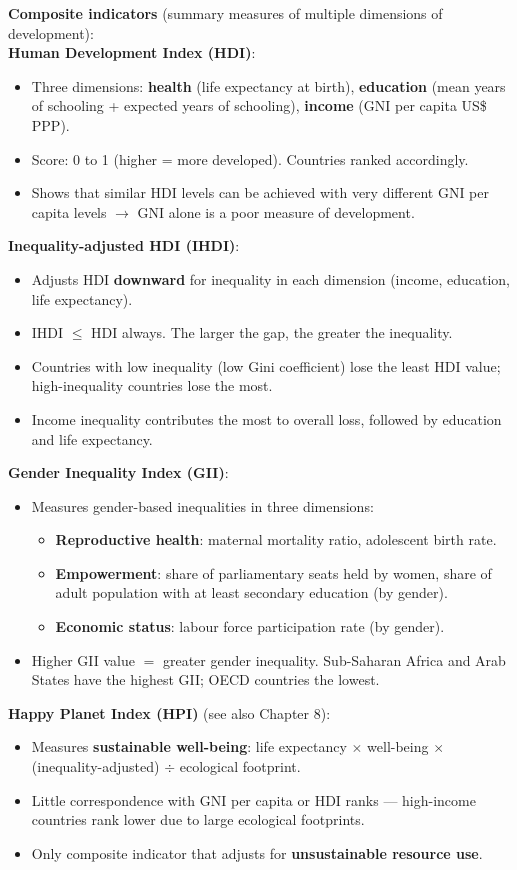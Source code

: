 \documentclass[a4paper,12pt]{article}
\begin{document}
\textbf{Composite indicators} (summary measures of multiple dimensions of development):
\\
\textbf{Human Development Index (HDI)}:
\begin{itemize}
  \item Three dimensions: \textbf{health} (life expectancy at birth), \textbf{education} (mean years of schooling + expected years of schooling), \textbf{income} (GNI per capita US\$ PPP).
  \item Score: 0 to 1 (higher = more developed). Countries ranked accordingly.
  \item Shows that similar HDI levels can be achieved with very different GNI per capita levels $\to$ GNI alone is a poor measure of development.
\end{itemize}
\textbf{Inequality-adjusted HDI (IHDI)}:
\begin{itemize}
  \item Adjusts HDI \textbf{downward} for inequality in each dimension (income, education, life expectancy).
  \item IHDI $\leq$ HDI always. The larger the gap, the greater the inequality.
  \item Countries with low inequality (low Gini coefficient) lose the least HDI value; high-inequality countries lose the most.
  \item Income inequality contributes the most to overall loss, followed by education and life expectancy.
\end{itemize}
\textbf{Gender Inequality Index (GII)}:
\begin{itemize}
  \item Measures gender-based inequalities in three dimensions:
  \begin{itemize}
    \item \textbf{Reproductive health}: maternal mortality ratio, adolescent birth rate.
    \item \textbf{Empowerment}: share of parliamentary seats held by women, share of adult population with at least secondary education (by gender).
    \item \textbf{Economic status}: labour force participation rate (by gender).
  \end{itemize}
  \item Higher GII value $=$ greater gender inequality. Sub-Saharan Africa and Arab States have the highest GII; OECD countries the lowest.
\end{itemize}
\textbf{Happy Planet Index (HPI)} (see also Chapter 8):
\begin{itemize}
  \item Measures \textbf{sustainable well-being}: life expectancy $\times$ well-being $\times$ (inequality-adjusted) $\div$ ecological footprint.
  \item Little correspondence with GNI per capita or HDI ranks --- high-income countries rank lower due to large ecological footprints.
  \item Only composite indicator that adjusts for \textbf{unsustainable resource use}.
\end{itemize}
\end{document}
